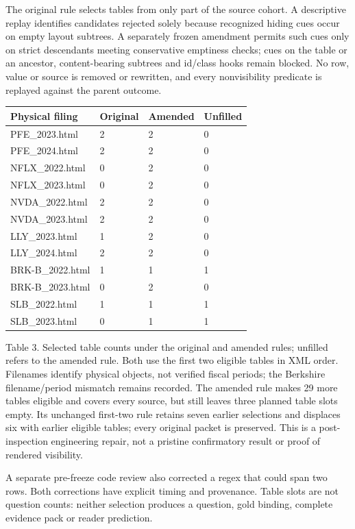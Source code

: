 \documentclass[10pt,a4paper]{article}
\begin{document}
The original rule selects tables from only part of the source cohort. A descriptive replay identifies candidates rejected solely because recognized hiding cues occur on empty layout subtrees. A separately frozen amendment permits such cues only on strict descendants meeting conservative emptiness checks; cues on the table or an ancestor, content-bearing subtrees and id/class hooks remain blocked. No row, value or source is removed or rewritten, and every nonvisibility predicate is replayed against the parent outcome.

\begin{longtable}{@{}p{}p{}p{}p{}@{}}\toprule
\textbf{Physical filing} & \textbf{Original} & \textbf{Amended} & \textbf{Unfilled} \\ \midrule\endhead
PFE\_2023.html & 2 & 2 & 0 \\
PFE\_2024.html & 2 & 2 & 0 \\
NFLX\_2022.html & 0 & 2 & 0 \\
NFLX\_2023.html & 0 & 2 & 0 \\
NVDA\_2022.html & 2 & 2 & 0 \\
NVDA\_2023.html & 2 & 2 & 0 \\
LLY\_2023.html & 1 & 2 & 0 \\
LLY\_2024.html & 2 & 2 & 0 \\
BRK-B\_2022.html & 1 & 1 & 1 \\
BRK-B\_2023.html & 0 & 2 & 0 \\
SLB\_2022.html & 1 & 1 & 1 \\
SLB\_2023.html & 0 & 1 & 1 \\
\bottomrule\end{longtable}
{\small Table 3. Selected table counts under the original and amended rules; unfilled refers to the amended rule. Both use the first two eligible tables in XML order. Filenames identify physical objects, not verified fiscal periods; the Berkshire filename/period mismatch remains recorded.}
The amended rule makes 29 more tables eligible and covers every source, but still leaves three planned table slots empty. Its unchanged first-two rule retains seven earlier selections and displaces six with earlier eligible tables; every original packet is preserved. This is a post-inspection engineering repair, not a pristine confirmatory result or proof of rendered visibility.

A separate pre-freeze code review also corrected a regex that could span two rows. Both corrections have explicit timing and provenance. Table slots are not question counts: neither selection produces a question, gold binding, complete evidence pack or reader prediction.
\end{document}
